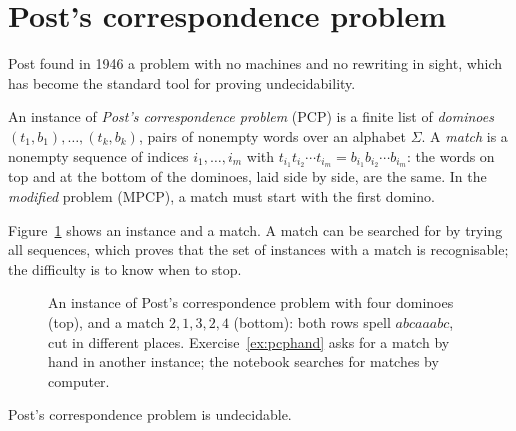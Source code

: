 \section{Post's correspondence problem}\label{sec:pcp}

Post found in 1946 a problem with no machines and no rewriting in sight, which has become the standard tool for proving undecidability.

\begin{definition}\label{def:pcp}
An instance of \emph{Post's correspondence problem} (PCP) is a finite list of \emph{dominoes} $(t_1,b_1),\dots,(t_k,b_k)$, pairs of nonempty words over an alphabet $\Sigma$. A \emph{match} is a nonempty sequence of indices $i_1,\dots,i_m$ with $t_{i_1}t_{i_2}\cdots t_{i_m}=b_{i_1}b_{i_2}\cdots b_{i_m}$: the words on top and at the bottom of the dominoes, laid side by side, are the same. In the \emph{modified} problem (MPCP), a match must start with the first domino.
\end{definition}

Figure~\ref{fig:pcp} shows an instance and a match. A match can be searched for by trying all sequences, which proves that the set of instances with a match is recognisable; the difficulty is to know when to stop.

\begin{figure}[ht]
\centering
{}
\caption{An instance of Post's correspondence problem with four dominoes (top), and a match $2,1,3,2,4$ (bottom): both rows spell $abcaaabc$, cut in different places. Exercise~\ref{ex:pcphand} asks for a match by hand in another instance; the notebook searches for matches by computer.}
\label{fig:pcp}
\end{figure}

\begin{theorem}[Post, 1946]\label{thm:pcp}
Post's correspondence problem is undecidable.
\end{theorem}

